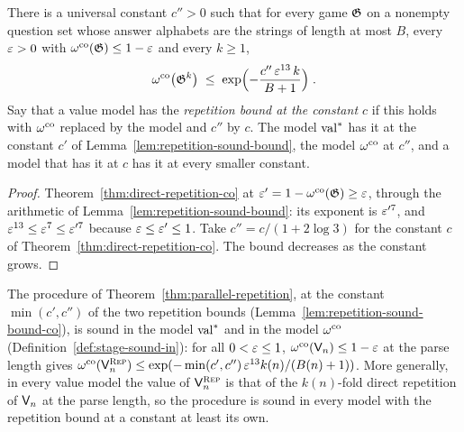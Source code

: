 \begin{lemma}
\label{lem:repetition-sound-bound-co}
\leanok
There is a universal constant $c'' > 0$ such that for every game $\mathfrak{G}$ on a nonempty question
set whose answer alphabets are the strings of length at most $B$, every $\varepsilon > 0$ with
$\omega^{\mathrm{co}}(\mathfrak{G}) \leq 1 - \varepsilon$ and every $k \geq 1$,
\begin{equation*}
  \omega^{\mathrm{co}}\bigl( \mathfrak{G}^{k} \bigr) \;\leq\; \exp\Bigl( - \frac{c''\, \varepsilon^{13}\, k}{B + 1} \Bigr)\;.
\end{equation*}
Say that a value model has the \emph{repetition bound at the constant $c$} if this holds with
$\omega^{\mathrm{co}}$ replaced by the model and $c''$ by $c$. The model $\mathrm{val}^*$ has it at the constant
$c'$ of Lemma~\ref{lem:repetition-sound-bound}, the model $\omega^{\mathrm{co}}$ at $c''$, and a model that
has it at $c$ has it at every smaller constant.
\end{lemma}

\begin{proof}
\leanok
Theorem~\ref{thm:direct-repetition-co} at $\varepsilon' = 1 - \omega^{\mathrm{co}}(\mathfrak{G}) \geq \varepsilon$, through the
arithmetic of Lemma~\ref{lem:repetition-sound-bound}: its exponent is $\varepsilon'^7$, and
$\varepsilon^{13} \leq \varepsilon^7 \leq \varepsilon'^7$ because $\varepsilon \leq \varepsilon' \leq 1$. Take
$c'' = c / (1 + 2 \log 3)$ for the constant $c$ of Theorem~\ref{thm:direct-repetition-co}. The
bound decreases as the constant grows.
\end{proof}

\begin{theorem}
\label{thm:parallel-repetition-co}
\leanok
The procedure of Theorem~\ref{thm:parallel-repetition}, at the constant
$\min(c', c'')$ of the two repetition bounds (Lemma~\ref{lem:repetition-sound-bound-co}), is
sound in the model $\mathrm{val}^*$ and in the model $\omega^{\mathrm{co}}$ (Definition~\ref{def:stage-sound-in}):
for all $0 < \varepsilon \leq 1$, $\omega^{\mathrm{co}}(\mathsf{V}_n) \leq 1 - \varepsilon$ at the parse length gives
$\omega^{\mathrm{co}}(\mathsf{V}^{\textsc{Rep}}_n) \leq \exp(-\min(c', c'')\, \varepsilon^{13} k(n) / (B(n) + 1))$. More generally, in
every value model the value of $\mathsf{V}^{\textsc{Rep}}_n$ is that of the $k(n)$-fold direct repetition of
$\mathsf{V}_n$ at the parse length, so the procedure is sound in every model with the repetition
bound at a constant at least its own.
\end{theorem}

